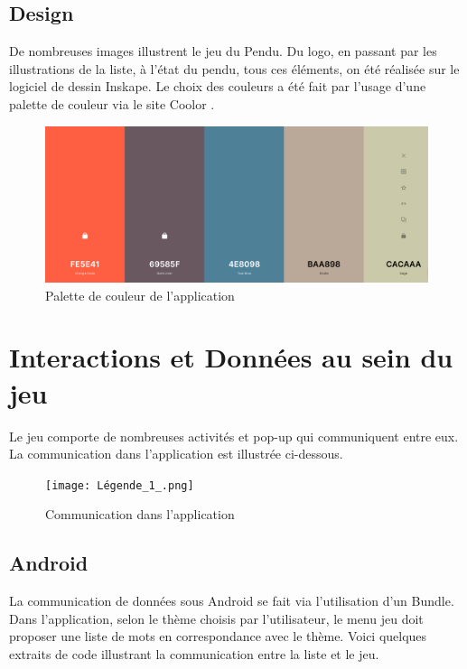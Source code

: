 \documentclass{article}
\begin{document}
\subsection{Design}
De nombreuses images illustrent le jeu du Pendu. Du logo, en passant par les illustrations de la liste, à l'état du pendu, tous ces éléments, on été réalisée sur le logiciel de dessin Inskape\cite{inskape}. Le choix des couleurs a été fait par l'usage d'une palette de couleur via le site Coolor
 \cite{colors}. 
\begin{figure}[h!]
\centering
\color{black}
\includegraphics[scale=0.1]{Screenshot_2021-05-01 Create a palette - Coolors.png}
\caption{Palette de couleur de l'application }
\label{fig:couleur}
\end{figure}


\section{Interactions et Données au sein du jeu}
Le jeu comporte de nombreuses activités et pop-up qui communiquent entre eux. La communication dans l'application est illustrée ci-dessous.


\begin{figure}[h!]
\color{black}
\centering
\texttt{[image: Légende\_1\_.png]}
\caption{Communication dans l'application }
\label{fig:legende}
\end{figure}





\subsection{Android} %

La communication de données sous Android se fait via l'utilisation d'un Bundle. Dans l'application, selon le thème choisis par l'utilisateur, le menu jeu doit proposer une liste de mots en correspondance avec le thème. Voici quelques extraits de code illustrant la communication entre la liste et le jeu.
\end{document}
